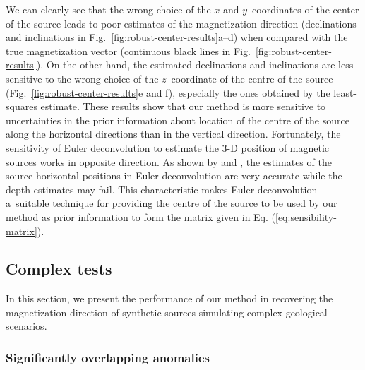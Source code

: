 \documentclass[journal abbreviation, npg]{copernicus}
\begin{document}
We can clearly see that the wrong choice of the $x$ and $y$~coordinates of
the center of the source leads to poor estimates of the magnetization
direction (declinations and inclinations in
Fig.~\ref{fig:robust-center-results}a--d) when compared with the true
magnetization vector (continuous black lines in
Fig.~\ref{fig:robust-center-results}). On the other hand, the estimated
declinations and inclinations are less sensitive to the wrong choice of the
$z$~coordinate of the centre of the source
(Fig.~\ref{fig:robust-center-results}e and f), especially the ones obtained
by the least-squares estimate. These results show that our method is more
sensitive to uncertainties in the prior information about location of the
centre of the source along the horizontal directions than in the vertical
direction. Fortunately, the sensitivity of Euler deconvolution to estimate
the 3-D position of magnetic sources works in opposite direction. As shown by
\citet{silva-barbosa2003} and \citet{melo-etal2013}, the estimates of the
source horizontal positions in Euler deconvolution are very accurate while
the depth estimates may fail. This characteristic makes Euler deconvolution
a~suitable technique for providing the centre of the source to be used by our
method as prior information to form the matrix given in Eq.
(\ref{eq:sensibility-matrix}).

\subsection{Complex tests}

In this section, we present the performance of our method in recovering
the magnetization direction of synthetic sources simulating complex 
geological scenarios.

\subsubsection{Significantly overlapping anomalies}
\end{document}
